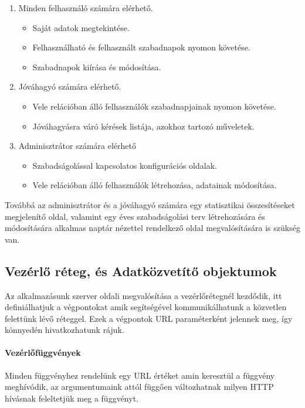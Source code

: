 \begin{enumerate}
	\item Minden felhasználó számára elérhető.
	\begin{itemize}
		\item Saját adatok megtekintése.
		\item Felhasználható és felhasznált szabadnapok nyomon követése.
		\item Szabadnapok kiírása és módosítása.
	\end{itemize}
	\item Jóváhagyó számára elérhető.
	\begin{itemize}
		\item Vele relációban álló felhasználók szabadnapjainak nyomon követése.
		\item Jóváhagyásra váró kérések listája, azokhoz tartozó műveletek.
	\end{itemize}
	\item Adminisztrátor számára elérhető
	\begin{itemize}
		\item Szabadságolással kapcsolatos konfigurációs oldalak.
		\item Vele relációban álló felhasználók létrehozása, adatainak módosítása.
	\end{itemize}
\end{enumerate}

Továbbá az adminisztrátor és a jóváhagyó számára egy statisztikai összesítéseket megjelenítő oldal, valamint egy éves szabadságolási terv létrehozására és módosítására alkalmas naptár nézettel rendelkező oldal megvalósítására is szükség van.

\subsection{Vezérlő réteg, és Adatközvetítő objektumok}

Az alkalmazásunk szerver oldali megvalósítása a vezérlőrétegnél kezdődik, itt definiálhatjuk a végpontokat amik segítségével kommunikálhatunk a közvetlen felettünk lévő réteggel. Ezek a végpontok URL paraméterként jelennek meg, így könnyedén hivatkozhatunk rájuk.

\paragraph{Vezérlőfüggvények}
Minden függvényhez rendelünk egy URL értéket amin keresztül a függvény meghívódik, az argumentumaink attól függően változhatnak milyen HTTP hívásnak feleltetjük meg a függvényt. 

